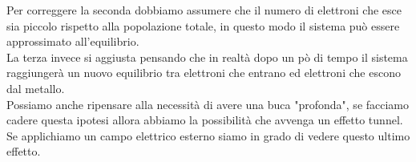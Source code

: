 Per correggere la seconda dobbiamo assumere che il numero di elettroni che esce sia piccolo rispetto alla popolazione totale, in questo modo il sistema può essere approssimato all'equilibrio.\\
La terza invece si aggiusta pensando che in realtà dopo un pò di tempo il sistema raggiungerà un nuovo equilibrio tra elettroni che entrano ed elettroni che escono dal metallo.\\
Possiamo anche ripensare alla necessità di avere una buca "profonda", se facciamo cadere questa ipotesi allora abbiamo la possibilità che avvenga un effetto tunnel. Se applichiamo un campo elettrico esterno siamo in grado di vedere questo ultimo effetto.
